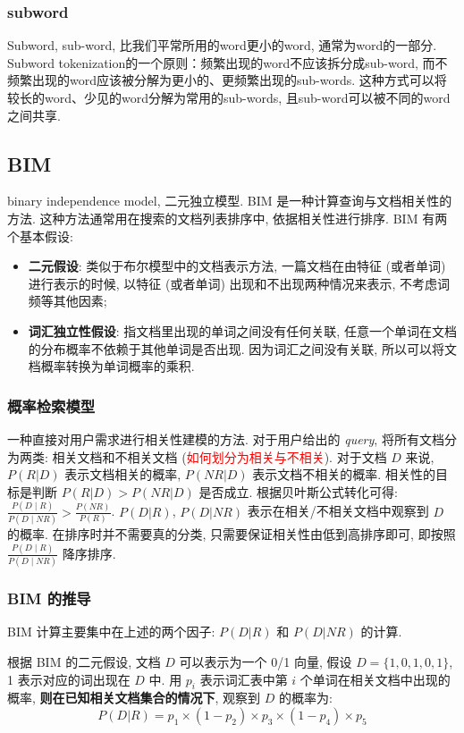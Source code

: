 \subsubsection{subword}
Subword, sub-word, 比我们平常所用的word更小的word, 通常为word的一部分. Subword tokenization的一个原则：频繁出现的word不应该拆分成sub-word, 而不频繁出现的word应该被分解为更小的、更频繁出现的sub-words. 这种方式可以将较长的word、少见的word分解为常用的sub-words, 且sub-word可以被不同的word之间共享. 


\subsection{BIM}
binary independence model, 二元独立模型. BIM 是一种计算查询与文档相关性的方法. 这种方法通常用在搜索的文档列表排序中, 依据相关性进行排序. BIM 有两个基本假设: 
\begin{itemize}
	\item \textbf{二元假设}: 类似于布尔模型中的文档表示方法, 一篇文档在由特征 (或者单词) 进行表示的时候, 以特征 (或者单词) 出现和不出现两种情况来表示, 不考虑词频等其他因素;
	
	\item \textbf{词汇独立性假设}: 指文档里出现的单词之间没有任何关联, 任意一个单词在文档的分布概率不依赖于其他单词是否出现. 因为词汇之间没有关联, 所以可以将文档概率转换为单词概率的乘积.
\end{itemize} 

\subsubsection{概率检索模型}
一种直接对用户需求进行相关性建模的方法. 对于用户给出的 \textit{query}, 将所有文档分为两类: 相关文档和不相关文档 (\textcolor{red}{如何划分为相关与不相关}). 对于文档 $D$ 来说, $P(R|D)$ 表示文档相关的概率, $P(NR|D)$ 表示文档不相关的概率. 相关性的目标是判断 $P(R|D) > P(NR|D)$ 是否成立. 根据贝叶斯公式转化可得: $\frac{P(D \mid R)}{P(D \mid N R)}>\frac{P(N R)}{P(R)}$. $P(D|R)$, $P(D|NR)$ 表示在相关/不相关文档中观察到 $D$ 的概率. 在排序时并不需要真的分类, 只需要保证相关性由低到高排序即可, 即按照 $\frac{P(D \mid R)}{P(D \mid N R)}$ 降序排序.

\subsubsection{BIM 的推导}
BIM 计算主要集中在上述的两个因子: $P(D|R)$ 和 $P(D|NR)$ 的计算.

根据 BIM 的二元假设, 文档 $D$ 可以表示为一个 0/1 向量, 假设 $D = \{1, 0, 1, 0, 1\}$, 1 表示对应的词出现在 $D$ 中. 用 $p_i$ 表示词汇表中第 $i$ 个单词在相关文档中出现的概率, \textbf{则在已知相关文档集合的情况下}, 观察到 $D$ 的概率为:
$$
P(D|R) = p_1 \times (1-p_2) \times p_3 \times (1-p_4) \times p_5
$$

